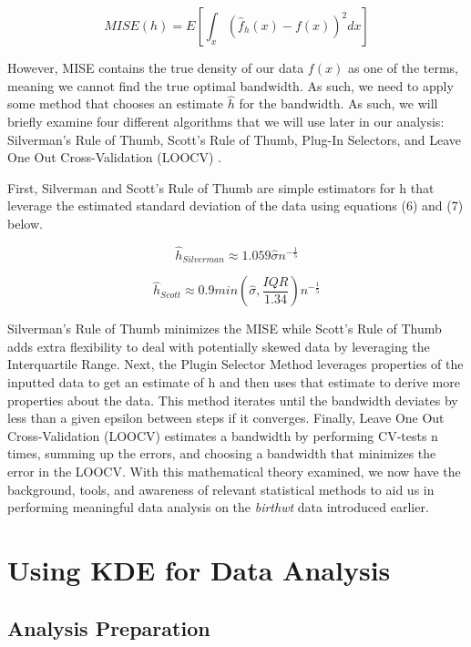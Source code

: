 \documentclass{article}
\begin{document}
\begin{equation}
    MISE(h) = E[\int_x (\hat f_h(x) - f(x))^2 dx]
\end{equation}

However, MISE contains the true density of our data $f(x)$ as one of the terms, meaning we cannot find the true optimal bandwidth. As such, we need to apply some method that chooses an estimate $\hat h$ for the bandwidth. As such, we will briefly examine four different algorithms that we will use later in our analysis: Silverman's Rule of Thumb, Scott's Rule of Thumb, Plug-In Selectors, and Leave One Out Cross-Validation (LOOCV) \cite{refId0}.

\newpage

First, Silverman and Scott's Rule of Thumb are simple estimators for h that leverage the estimated standard deviation of the data using equations (6) and (7) below.

\begin{equation}
    \hat h_{Silverman} \approx 1.059 \hat \sigma n^{-\frac{1}{5}}
\end{equation}

\begin{equation}
    \hat h_{Scott} \approx 0.9min(\hat \sigma, \frac{IQR}{1.34})n^{-\frac{1}{5}}
\end{equation}

Silverman's Rule of Thumb minimizes the MISE \cite{refId0} while Scott's Rule of Thumb adds extra flexibility to deal with potentially skewed data by leveraging the Interquartile Range. Next, the Plugin Selector Method leverages properties of the inputted data to get an estimate of h and then uses that estimate to derive more properties about the data. This method iterates until the bandwidth deviates by less than a given epsilon between steps if it converges. Finally, Leave One Out Cross-Validation (LOOCV) estimates a bandwidth by performing CV-tests n times, summing up the errors, and choosing a bandwidth that minimizes the error in the LOOCV. With this mathematical theory examined, we now have the background, tools, and awareness of relevant statistical methods to aid us in performing meaningful data analysis on the \textit{birthwt} data introduced earlier.

\section{Using KDE for Data Analysis}

\subsection{Analysis Preparation}
\end{document}
